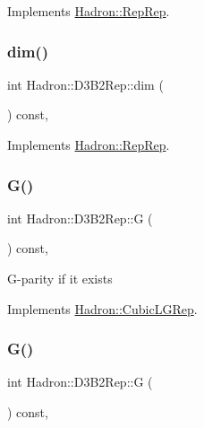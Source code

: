 Implements \mbox{\hyperlink{structHadron_1_1RepRep_a92c8802e5ed7afd7da43ccfd5b7cd92b}{Hadron\+::\+Rep\+Rep}}.

\mbox{\label{structHadron_1_1D3B2Rep_a5b1737e056dda55a033851622de1412c}} 
\subsubsection{\texorpdfstring{dim()}{dim()}\hspace{0.1cm}{\footnotesize\ttfamily [3/3]}}
{\footnotesize\ttfamily int Hadron\+::\+D3\+B2\+Rep\+::dim (\begin{DoxyParamCaption}{ }\end{DoxyParamCaption}) const\hspace{0.3cm}{\ttfamily [inline]}, {\ttfamily [virtual]}}



Implements \mbox{\hyperlink{structHadron_1_1RepRep_a92c8802e5ed7afd7da43ccfd5b7cd92b}{Hadron\+::\+Rep\+Rep}}.

\mbox{\label{structHadron_1_1D3B2Rep_ac12858607dfa7833b4f2a6961139e1b9}} 
\subsubsection{\texorpdfstring{G()}{G()}\hspace{0.1cm}{\footnotesize\ttfamily [1/2]}}
{\footnotesize\ttfamily int Hadron\+::\+D3\+B2\+Rep\+::G (\begin{DoxyParamCaption}{ }\end{DoxyParamCaption}) const\hspace{0.3cm}{\ttfamily [inline]}, {\ttfamily [virtual]}}

G-\/parity if it exists 

Implements \mbox{\hyperlink{structHadron_1_1CubicLGRep_ace26f7b2d55e3a668a14cb9026da5231}{Hadron\+::\+Cubic\+L\+G\+Rep}}.

\mbox{\label{structHadron_1_1D3B2Rep_ac12858607dfa7833b4f2a6961139e1b9}} 
\subsubsection{\texorpdfstring{G()}{G()}\hspace{0.1cm}{\footnotesize\ttfamily [2/2]}}
{\footnotesize\ttfamily int Hadron\+::\+D3\+B2\+Rep\+::G (\begin{DoxyParamCaption}{ }\end{DoxyParamCaption}) const\hspace{0.3cm}{\ttfamily [inline]}, {\ttfamily [virtual]}}

